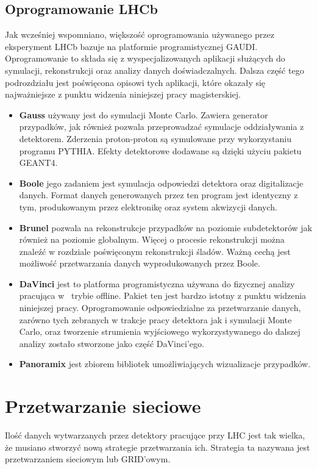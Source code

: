 \subsection{Oprogramowanie LHCb}
Jak wcześniej wspomniano, większość oprogramowania używanego przez eksperyment LHCb bazuje na platformie programistycznej GAUDI. Oprogramowanie to składa się z wyspecjalizowanych aplikacji służących do symulacji, rekonstrukcji oraz analizy danych doświadczalnych. Dalsza część tego podrozdziału jest poświęcona opisowi tych aplikacji, które okazały się  najważniejsze z  punktu widzenia niniejszej pracy magisterskiej.
\begin{itemize}
\item \textbf{Gauss} używany jest do symulacji Monte Carlo. Zawiera generator przypadków, jak również pozwala przeprowadzać symulacje oddziaływania z detektorem. Zderzenia proton-proton są symulowane przy wykorzystaniu programu PYTHIA\citep{PYTHIA}. Efekty detektorowe dodawane są dzięki użyciu pakietu GEANT4. 
\item \textbf{Boole} jego zadaniem jest symulacja odpowiedzi detektora oraz digitalizacje danych. Format danych generowanych przez ten program jest identyczny z tym, produkowanym przez elektronikę oraz system akwizycji danych. 
\item \textbf{Brunel} pozwala na rekonstrukcje przypadków na poziomie subdetektorów jak również na poziomie globalnym. Więcej o procesie rekonstrukcji można znaleźć w rozdziale poświęconym rekonstrukcji śladów. Ważną cechą jest możliwość przetwarzania danych wyprodukowanych przez Boole.
\item \textbf{DaVinci} jest to platforma programistyczna używana do fizycznej analizy pracująca w~ trybie offline. Pakiet ten jest bardzo istotny z punktu widzenia niniejszej pracy. Oprogramowanie odpowiedzialne za przetwarzanie danych, zarówno tych zebranych w trakcje pracy detektora jak i symulacji Monte Carlo, oraz tworzenie strumienia wyjściowego wykorzystywanego do dalszej analizy zostało stworzone jako część DaVinci'ego.
\item \textbf{Panoramix} jest zbiorem bibliotek umożliwiających wizualizacje przypadków.    
\end{itemize}
\section{Przetwarzanie sieciowe}
Ilość danych wytwarzanych przez detektory pracujące przy LHC jest tak wielka, że musiano stworzyć nową strategie przetwarzania ich. Strategia ta nazywana jest przetwarzaniem sieciowym lub GRID'owym. 

